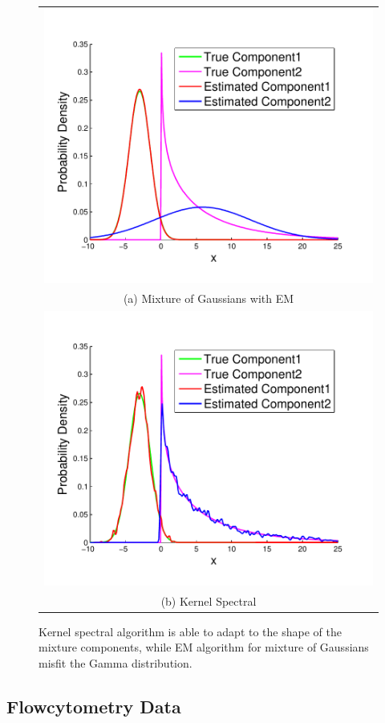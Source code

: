 \documentclass{article}
\begin{document}
\begin{figure}[t]
  \centering
  \renewcommand{\tabcolsep}{5pt}
  \begin{tabular}{c}
  \includegraphics[width=0.70\columnwidth]{../experiment/visualization/em_visual_k_2_view_1-crop} \\
  (a) Mixture of Gaussians with EM\\
  \includegraphics[width=0.70\columnwidth]{../experiment/visualization/visual_k_2_view_1-crop} \\
  (b) Kernel Spectral
  \end{tabular}
  \vspace{-3mm}
  \caption{Kernel spectral algorithm is able to adapt to the shape of the mixture components, while EM algorithm for mixture of Gaussians misfit the Gamma distribution.}\label{fig:shape}
  \vspace{-3mm}
\end{figure}

\subsection{Flowcytometry Data}

\end{document}
